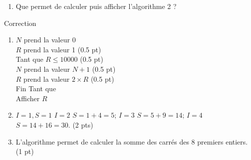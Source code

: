 \documentclass[a4paper,11pt]{article}
\theoremstyle{break}
\begin{document}
\begin{exo}
\begin{enumerate}
 \item Que permet de calculer puis afficher l'algorithme 2 ?
 
  \end{enumerate}

\begin{correction}

Correction
\begin{enumerate}
 \item 
 
 $N$ prend la valeur 0\\
   
   $R$ prend la valeur 1 (0.5 pt)\\
   
   Tant que $R \leq 10000$ (0.5 pt)\\
   
   $N$ prend la valeur $N+1$ (0.5 pt)\\
   
   $R$ prend la valeur $2 \times R$ (0.5 pt)\\ 
   
   Fin Tant que \\
   
   Afficher $R$
 
 
 \item $I=1,S=1$ $I=2$ $S=1+4=5$; $I=3$ $S=5+9=14$; $I=4$ $S=14+16=30$. (2 pts)
  
 \item L'algorithme permet de calculer la somme des carr\'es des 8 premiers entiers. (1 pt)
 
\end{enumerate}

\end{correction}

  \end{exo}
 ~
    
\end{document}
